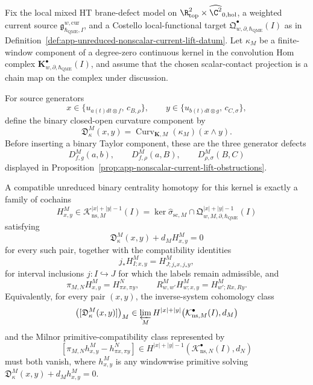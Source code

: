 \begin{thm}
\label{thm:app-curved-kernel-centrality-homotopy-criterion}
  Fix the local mixed HT brane-defect model on
  \(\R^2_{\mathrm{top}}\times\widehat{\C^2}_{0,\mathrm{hol}}\), a
  weighted current source
  \(\mathfrak g^{w,\mathrm{cur}}_{\hbar_{\mathrm{QME}},I}\), and a Costello
  local-functional target
  \(\mathfrak Q^\bullet_{w,\partial,\hbar_{\mathrm{QME}}}(I)\) as in
  Definition~\ref{def:app-unreduced-nonscalar-current-lift-datum}.  Let
  \(\kappa_M\) be a finite-window component of a degree-zero continuous
  kernel in the convolution Hom complex
  \(\mathbf K^\bullet_{w,\partial,\hbar_{\mathrm{QME}}}(I)\), and assume that the chosen
  scalar-contact projection is a chain map on the complex under
  discussion.

  For source generators
  \[
    x\in\{u_{a(t)dt\otimes f},\,c_{B,\rho}\},\qquad
    y\in\{u_{b(t)dt\otimes g},\,c_{C,\sigma}\},
  \]
  define the binary closed-open curvature component by
  \[
    \mathfrak D^M_\kappa(x,y)
      =
    \operatorname{Curv}_{\mathbf K,M}(\kappa_M)(x\wedge y).
  \]
  Before inserting a binary Taylor component, these are the
  three generator defects
  \[
    D^M_{f,g}(a,b),\qquad
    D^M_{f,\rho}(a,B),\qquad
    D^M_{\rho,\sigma}(B,C)
  \]
  displayed in
  Proposition~\ref{prop:app-nonscalar-current-lift-obstructions}.

  A compatible unreduced binary centrality homotopy for this kernel is
  exactly a family of cochains
  \[
    H^M_{x,y}\in
    \mathcal K^{|x|+|y|-1}_{\mathrm{ns},M}(I)
      =
    \ker\widehat\sigma_{\mathrm{sc},M}
      \cap
    \mathfrak Q^{|x|+|y|-1}_{w,M,\partial,\hbar_{\mathrm{QME}}}(I)
  \]
  satisfying
  \begin{equation}
    \mathfrak D^M_\kappa(x,y)+d_M H^M_{x,y}=0
    \label{eq:app-centrality-homotopy-equation}
  \end{equation}
  for every such pair, together with the compatibility identities
  \[
    j_*H^M_{I;x,y}
      =
    H^M_{J;j_*x,j_*y},
  \]
  for interval inclusions \(j:I\hookrightarrow J\) for which the labels
  remain admissible, and
  \[
    \pi_{M,N}H^M_{x,y}=H^N_{\pi x,\pi y},
    \qquad
    R^M_{w,w'}H^M_{w;x,y}=H^M_{w';Rx,Ry}.
  \]
  Equivalently, for every pair \((x,y)\), the inverse-system cohomology
  class
  \[
    \bigl([\mathfrak D^M_\kappa(x,y)]\bigr)_M
    \in
    \varprojlim_M
    H^{|x|+|y|}\!
    \left(\mathcal K^\bullet_{\mathrm{ns},M}(I),d_M\right)
  \]
  and the Milnor primitive-compatibility class represented by
  \[
    \left[
      \pi_{M,N}h^M_{x,y}-h^N_{\pi x,\pi y}
    \right]
    \in
    H^{|x|+|y|-1}
    \left(\mathcal K^\bullet_{\mathrm{ns},N}(I),d_N\right)
  \]
  must both vanish, where \(h^M_{x,y}\) is any windowwise primitive
  solving
  \(\mathfrak D^M_\kappa(x,y)+d_M h^M_{x,y}=0\).


\end{thm}
